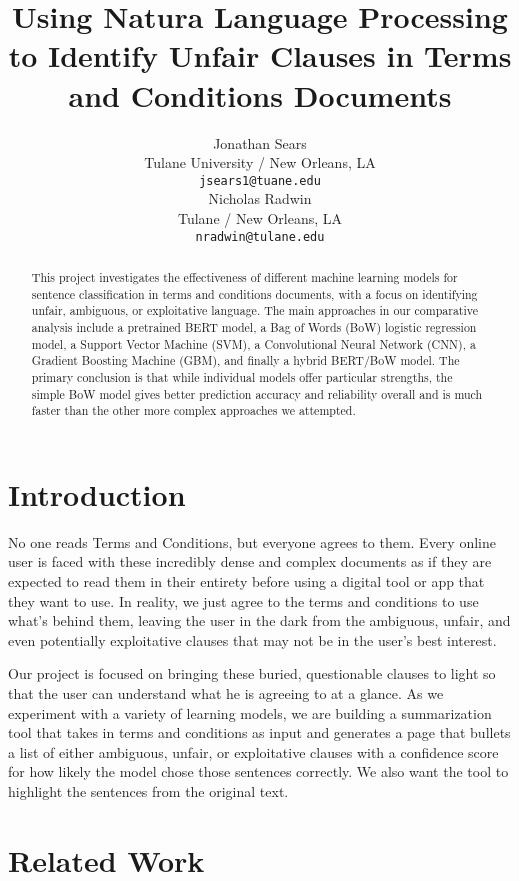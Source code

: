 \documentclass[11pt,a4paper]{article}
\title{Using Natura Language Processing to Identify Unfair Clauses in Terms and Conditions Documents}
\author{Jonathan Sears\\
  Tulane University / New Orleans, LA \\
  \texttt{jsears1@tuane.edu} \\\And
  Nicholas Radwin \\
  Tulane  / New Orleans, LA\\
  \texttt{nradwin@tulane.edu} \\}
\date{}
\begin{document}
\maketitle
\begin{abstract}

This project investigates the effectiveness of different machine learning models for sentence classification in terms and conditions documents, with a focus on identifying unfair, ambiguous, or exploitative language. The main approaches in our comparative analysis include a pretrained BERT model, a Bag of Words (BoW) logistic regression model, a Support Vector Machine (SVM), a Convolutional Neural Network (CNN), a Gradient Boosting Machine (GBM), and finally a hybrid BERT/BoW model. The primary conclusion is that while individual models offer particular strengths, the simple BoW model gives better prediction accuracy and reliability overall and is much faster than the other more complex approaches we attempted.
\end{abstract}


\section{Introduction}

No one reads Terms and Conditions, but everyone agrees to them. Every online user is faced with these incredibly dense and complex documents as if they are expected to read them in their entirety before using a digital tool or app that they want to use. In reality, we just agree to the terms and conditions to use what's behind them, leaving the user in the dark from the ambiguous, unfair, and even potentially exploitative clauses that may not be in the user's best interest.

Our project is focused on bringing these buried, questionable clauses to light so that the user can understand what he is agreeing to at a glance. As we experiment with a variety of learning models, we are building a summarization tool that takes in terms and conditions as input and generates a page that bullets a list of either ambiguous, unfair, or exploitative clauses with a confidence score for how likely the model chose those sentences correctly. We also want the tool to highlight the sentences from the original text.

\section{Related Work}
\end{document}
